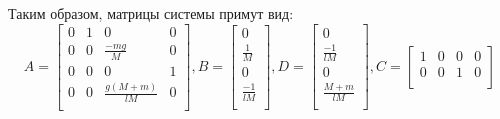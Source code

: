 Таким образом, матрицы системы примут вид: 
\begin{equation}
    A = \begin{bmatrix}
        0 & 1 & 0 & 0 \\
        0 & 0 & \frac{-mg}{M} & 0 \\
        0 & 0 & 0 & 1 \\
        0 & 0 & \frac{g(M + m)}{lM} & 0 \\
    \end{bmatrix}, B = \begin{bmatrix}
        0 \\
        \frac{1}{M} \\
        0 \\
        \frac{-1}{lM} \\
    \end{bmatrix}, D = \begin{bmatrix}
        0 \\
        \frac{-1}{lM} \\
        0 \\
        \frac{M + m}{lM} \\ 
    \end{bmatrix}, C = \begin{bmatrix}
        1 & 0 & 0 & 0 \\
        0 & 0 & 1 & 0 \\ 
    \end{bmatrix}
\end{equation}
